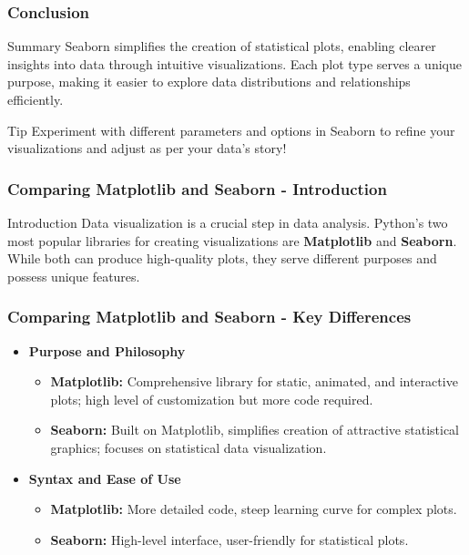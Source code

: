 \documentclass[aspectratio=169]{beamer}
\begin{document}
\begin{frame}[fragile]
    \frametitle{Conclusion}
    \begin{block}{Summary}
        Seaborn simplifies the creation of statistical plots, enabling clearer insights into data through intuitive visualizations. 
        Each plot type serves a unique purpose, making it easier to explore data distributions and relationships efficiently.
    \end{block}
    
    \begin{alertblock}{Tip}
        Experiment with different parameters and options in Seaborn to refine your visualizations and adjust as per your data's story!
    \end{alertblock}
\end{frame}

\begin{frame}[t]
  \frametitle{Comparing Matplotlib and Seaborn - Introduction}
  \begin{block}{Introduction}
    Data visualization is a crucial step in data analysis. Python's two most popular libraries for creating visualizations are \textbf{Matplotlib} and \textbf{Seaborn}. While both can produce high-quality plots, they serve different purposes and possess unique features.
  \end{block}
\end{frame}

\begin{frame}[t]
  \frametitle{Comparing Matplotlib and Seaborn - Key Differences}
  \begin{itemize}
    \item \textbf{Purpose and Philosophy}
      \begin{itemize}
        \item \textbf{Matplotlib:} Comprehensive library for static, animated, and interactive plots; high level of customization but more code required.
        \item \textbf{Seaborn:} Built on Matplotlib, simplifies creation of attractive statistical graphics; focuses on statistical data visualization.
      \end{itemize}
    \item \textbf{Syntax and Ease of Use}
      \begin{itemize}
        \item \textbf{Matplotlib:} More detailed code, steep learning curve for complex plots.
        \item \textbf{Seaborn:} High-level interface, user-friendly for statistical plots.
      \end{itemize}
  \end{itemize}
\end{frame}
\end{document}
